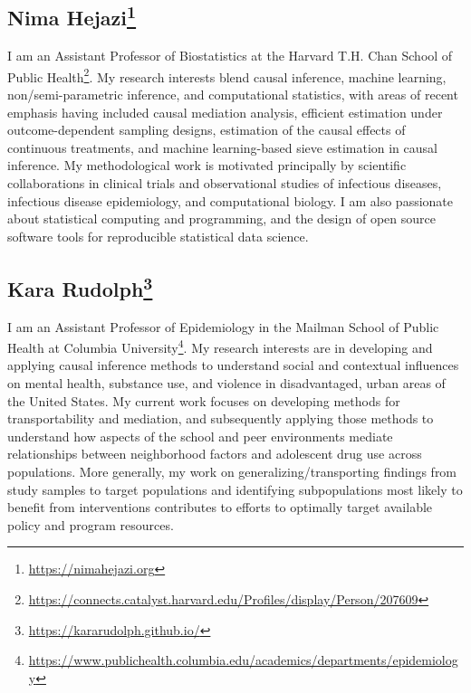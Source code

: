 \documentclass[
  12pt,
]{book}
\renewcommand{\href}[2]{#2\footnote{\url{#1}}}
\theoremstyle{definition}
\theoremstyle{definition}
\theoremstyle{definition}
\newcommand{\1}{\mathbbm{1}}
\begin{document}
\hypertarget{nima-hejazi}{%
\subsection*{\texorpdfstring{\href{https://nimahejazi.org}{Nima Hejazi}}{Nima Hejazi}}\label{nima-hejazi}}


I am an Assistant Professor of Biostatistics at the \href{https://connects.catalyst.harvard.edu/Profiles/display/Person/207609}{Harvard T.H. Chan School of
Public
Health}.
My research interests blend causal inference, machine learning,
non/semi-parametric inference, and computational statistics, with areas of
recent emphasis having included causal mediation analysis, efficient estimation
under outcome-dependent sampling designs, estimation of the causal effects of
continuous treatments, and machine learning-based sieve estimation in causal
inference. My methodological work is motivated principally by scientific
collaborations in clinical trials and observational studies of infectious
diseases, infectious disease epidemiology, and computational biology. I am also
passionate about statistical computing and programming, and the design of open
source software tools for reproducible statistical data science.

\hypertarget{kara-rudolph}{%
\subsection*{\texorpdfstring{\href{https://kararudolph.github.io/}{Kara Rudolph}}{Kara Rudolph}}\label{kara-rudolph}}


I am an Assistant Professor of Epidemiology in the \href{https://www.publichealth.columbia.edu/academics/departments/epidemiology}{Mailman School of Public
Health at Columbia
University}.
My research interests are in developing and applying causal inference methods to
understand social and contextual influences on mental health, substance use, and
violence in disadvantaged, urban areas of the United States. My current work
focuses on developing methods for transportability and mediation, and
subsequently applying those methods to understand how aspects of the school and
peer environments mediate relationships between neighborhood factors and
adolescent drug use across populations. More generally, my work on
generalizing/transporting findings from study samples to target populations and
identifying subpopulations most likely to benefit from interventions contributes
to efforts to optimally target available policy and program resources.
\end{document}
